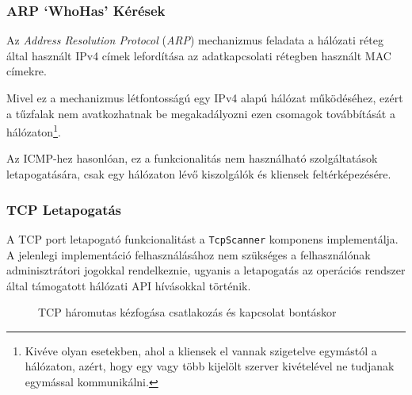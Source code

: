\subsubsection*{ARP `WhoHas' Kérések}

	Az \textit{Address Resolution Protocol} (\textit{ARP}) mechanizmus feladata a hálózati réteg által használt IPv4 címek lefordítása az adatkapcsolati rétegben használt MAC címekre.
	
	Mivel ez a mechanizmus létfontosságú egy IPv4 alapú hálózat működéséhez, ezért a tűzfalak nem avatkozhatnak be megakadályozni ezen csomagok továbbítását a hálózaton\footnote{Kivéve olyan esetekben, ahol a kliensek el vannak szigetelve egymástól a hálózaton, azért, hogy egy vagy több kijelölt szerver kivételével ne tudjanak egymással kommunikálni.}.
	
	Az ICMP-hez hasonlóan, ez a funkcionalitás nem használható szolgáltatások letapogatására, csak egy hálózaton lévő kiszolgálók és kliensek feltérképezésére.
	
\subsubsection*{TCP Letapogatás}

	A TCP port letapogató funkcionalitást a \texttt{TcpScanner} komponens implementálja. A jelenlegi implementáció felhasználásához nem szükséges a felhasználónak adminisztrátori jogokkal rendelkeznie, ugyanis a letapogatás az operációs rendszer által támogatott hálózati API hívásokkal történik.
	
	\begin{figure}[!htbp]
		\centering
		\caption{TCP háromutas kézfogása csatlakozás és kapcsolat bontáskor}
		\label{tcp3way_hu}
	\end{figure}
	
